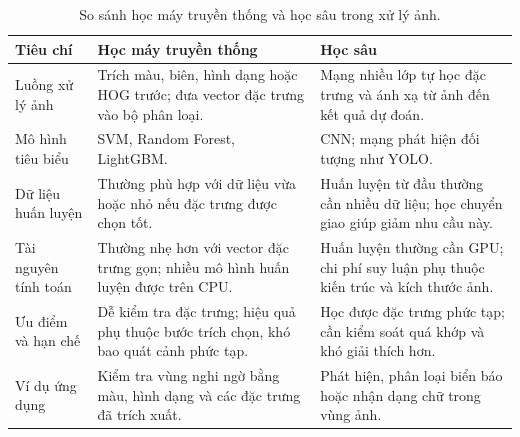\begin{table}[H]
\centering
\caption[So sánh học máy truyền thống và học sâu]{So sánh học máy truyền thống và học sâu trong xử lý ảnh.}
\label{tab:mldl}
\small
\begin{tabularx}{\textwidth}{|>{\raggedright\arraybackslash}p{2.5cm}|>{\raggedright\arraybackslash}X|>{\raggedright\arraybackslash}X|}
\toprule
\textbf{Tiêu chí} & \textbf{Học máy truyền thống} & \textbf{Học sâu} \\
\midrule
Luồng xử lý ảnh & Trích màu, biên, hình dạng hoặc HOG trước; đưa vector đặc trưng vào bộ phân loại. & Mạng nhiều lớp tự học đặc trưng và ánh xạ từ ảnh đến kết quả dự đoán. \\ \hline
Mô hình tiêu biểu & SVM, Random Forest, LightGBM. & CNN; mạng phát hiện đối tượng như YOLO. \\ \hline
Dữ liệu huấn luyện & Thường phù hợp với dữ liệu vừa hoặc nhỏ nếu đặc trưng được chọn tốt. & Huấn luyện từ đầu thường cần nhiều dữ liệu; học chuyển giao giúp giảm nhu cầu này. \\ \hline
Tài nguyên tính toán & Thường nhẹ hơn với vector đặc trưng gọn; nhiều mô hình huấn luyện được trên CPU. & Huấn luyện thường cần GPU; chi phí suy luận phụ thuộc kiến trúc và kích thước ảnh. \\ \hline
Ưu điểm và hạn chế & Dễ kiểm tra đặc trưng; hiệu quả phụ thuộc bước trích chọn, khó bao quát cảnh phức tạp. & Học được đặc trưng phức tạp; cần kiểm soát quá khớp và khó giải thích hơn. \\ \hline
Ví dụ ứng dụng & Kiểm tra vùng nghi ngờ bằng màu, hình dạng và các đặc trưng đã trích xuất. & Phát hiện, phân loại biển báo hoặc nhận dạng chữ trong vùng ảnh. \\
\bottomrule
\end{tabularx}
\end{table}
